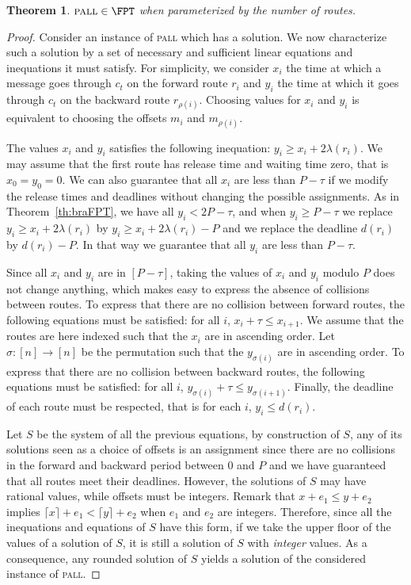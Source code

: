 \documentclass[a4paper,10pt]{article}
\newtheorem{theorem}{Theorem}
\newcommand\pall{\textsc{pall}\xspace}
\begin{document}
\begin{theorem}\label{th:pallFPT}
$\pall \in \FPT$ when parameterized by the number of routes.
\end{theorem}
\begin{proof}
 Consider an instance of \pall which has a solution. We now characterize such a solution by a set of necessary and sufficient linear equations and inequations it must satisfy. 
 For simplicity, we consider $x_i$ the time at which a message goes through $c_t$ on the forward route $r_i$ and $y_i$ the time at which it goes through $c_t$ on the backward route $r_{\rho(i)}$.
 Choosing values for $x_i$ and $y_i$ is equivalent to choosing the offsets $m_i$ and $m_{\rho(i)}$.
 
 The values $x_i$ and $y_i$ satisfies the following inequation: $y_i \geq x_i + 2\lambda(r_i)$.
We may assume that the first route has release time and waiting time zero, 
that is $x_0 = y_0 = 0$. We can also guarantee that all $x_i$ are less than $P-\tau$ if we modify
the release times and deadlines without changing the possible assignments. As in Theorem~\ref{th:braFPT}, we have all $y_i < 2P - \tau$,
and  when $y_i \geq P - \tau$ we replace $y_i \geq x_i + 2\lambda(r_i) $ by $y_i \geq x_i + 2\lambda(r_i) - P$ and we replace the deadline $d(r_i)$ by $d(r_i) -P$. In that way we guarantee that all $y_i$ are less than $P-\tau$.  
 
 Since all $x_i$ and $y_i$ are in $[P-\tau]$, taking the values of $x_i$ and $y_i$ modulo $P$
 does not change anything, which makes easy to express the absence of collisions between routes.
 To express that there are no collision between forward routes, the following equations must be  satisfied: for all $i$, $x_i + \tau \leq x_{i+1}$. We assume that the routes are here indexed such that the $x_i$ are in ascending order.
 Let $\sigma : [n] \rightarrow [n]$ be the permutation such that the $y_{\sigma(i)}$ are in ascending order.
 To express that there are no collision between backward routes, the following equations must be  satisfied: for all $i$, $y_{\sigma(i)} + \tau \leq y_{\sigma(i+1)}$. Finally, the deadline of each route must be respected, that is for each $i$, $y_i \leq d(r_i)$. 

 Let $S$ be the system of all the previous equations, by construction of $S$, any of its solutions seen as a choice of offsets is an assignment since there are no collisions in the forward and backward period between $0$ and $P$ and we have guaranteed that all routes meet their deadlines. However, the solutions of $S$ may have rational values, while offsets must be integers. 
Remark that $x +e_1 \leq y + e_2$ implies $\lceil x \rceil +e_1 < \lceil y \rceil + e_2$ when $e_1$ and $e_2$ are integers. Therefore, since all the inequations and equations of $S$ have this form, if we take the upper floor of the values of a solution of $S$, it is still a solution of $S$ with \emph{integer} values. As a consequence, any rounded solution of $S$ yields a solution of the considered instance of \pall.


\end{proof}
\end{document}

